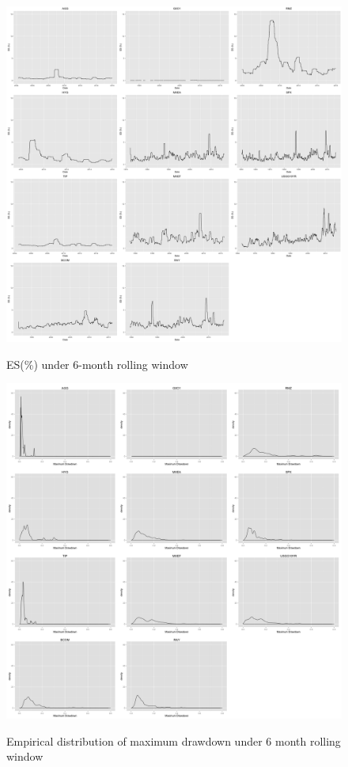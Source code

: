 \documentclass[12pt]{article}
\begin{document}
\begin{figure}[h]
\caption{ES(\%) under 6-month rolling window} 
\centering 
\includegraphics[width=15cm]{../results/ES6mon_scaled}
\label{fig: ES6mon}
\end{figure}

\begin{figure}[h]
\caption{Empirical distribution of maximum drawdown under 6 month rolling window} 
\centering 
\includegraphics[width=15cm]{../results/maxdd_dist_mon6}
\label{fig: dist_mdd}
\end{figure}
\end{document}
